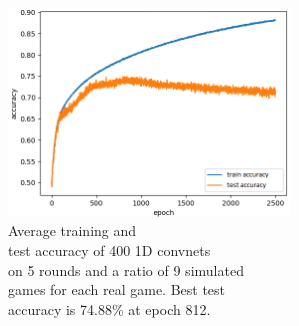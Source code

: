 \begin{minipage}{0.5\textwidth}
	\begin{figure}[H]
		\centering
		\includegraphics[width=7.5cm]{images/bestHistories/edit/1d_10s_sd9x_acc.png}
		\caption[Average training and test accuracy of 400 1D convnets on 5 rounds and a ratio of 9 simulated games for each real game.]{Average training and \\\hspace{0\textwidth}test accuracy of 400 1D convnets \\\hspace{0\textwidth}on 5 rounds and a ratio of 9 simulated  \\\hspace{0\textwidth}games for each real game. Best test \\\hspace{0\textwidth}accuracy is 74.88\% at epoch 812.}
		\label{fig:1d10}
	\end{figure}
\end{minipage}
